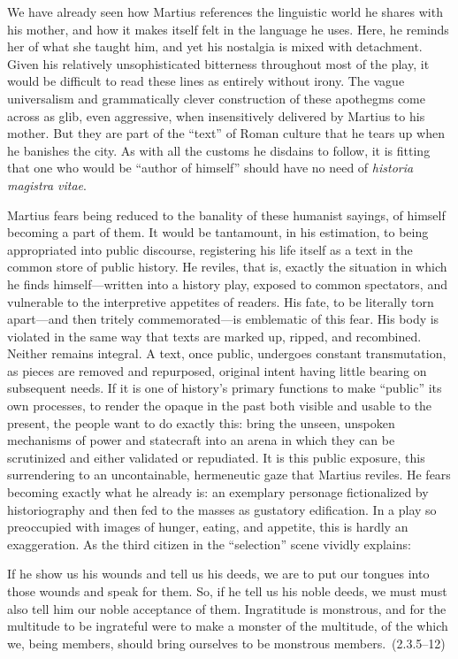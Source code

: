 We have already seen how Martius references the linguistic world he shares with his mother, and how it makes itself felt in the language he uses.
Here, he reminds her of what she taught him, and yet his nostalgia is mixed with detachment.
Given his relatively unsophisticated bitterness throughout most of the play, it would be difficult to read these lines as entirely without irony.
The vague universalism and grammatically clever construction of these apothegms come across as glib, even aggressive, when insensitively delivered by Martius to his mother.
But they are part of the ``text'' of Roman culture that he tears up when he banishes the city.
As with all the customs he disdains to follow, it is fitting that one who would be ``author of himself'' should have no need of \emph{historia magistra vitae}.

Martius fears being reduced to the banality of these humanist sayings, of himself becoming a part of them.
It would be tantamount, in his estimation, to being appropriated into public discourse, registering his life itself as a text in the common store of public history.
He reviles, that is, exactly the situation in which he finds himself---written into a history play, exposed to common spectators, and vulnerable to the interpretive appetites of readers.
His fate, to be literally torn apart---and then tritely commemorated---is emblematic of this fear.
His body is violated in the same way that texts are marked up, ripped, and recombined.
Neither remains integral.
A text, once public, undergoes constant transmutation, as pieces are removed and repurposed, original intent having little bearing on subsequent needs.
If it is one of history's primary functions to make ``public'' its own processes, to render the opaque in the past both visible and usable to the present, the people want to do exactly this: bring the unseen, unspoken mechanisms of power and statecraft into an arena in which they can be scrutinized and either validated or repudiated.
It is this public exposure, this surrendering to an uncontainable, hermeneutic gaze that Martius reviles.
He fears becoming exactly what he already is: an exemplary personage fictionalized by historiography and then fed to the masses as gustatory edification.
In a play so preoccupied with images of hunger, eating, and appetite, this is hardly an exaggeration.
As the third citizen in the ``selection'' scene vividly explains:
\begin{bq}
If he show us his wounds and tell us his deeds, we are to put our tongues into those wounds and speak for them.
So, if he tell us his noble deeds, we must must also tell him our noble acceptance of them.
Ingratitude is monstrous, and for the multitude to be ingrateful were to make a monster of the multitude, of the which we, being members, should bring ourselves to be monstrous members.~(2.3.5--12)
\end{bq}
